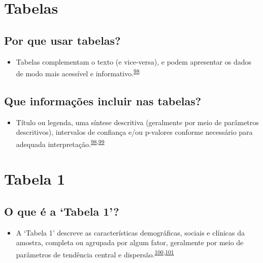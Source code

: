 \documentclass[
  a4paper,
]{book}
\providecommand{\tightlist}{%
  \setlength{\itemsep}{0pt}\setlength{\parskip}{0pt}}
\begin{document}
\hypertarget{tabelas}{%
\section{Tabelas}\label{tabelas}}

\hypertarget{por-que-usar-tabelas}{%
\subsection{Por que usar tabelas?}\label{por-que-usar-tabelas}}

\begin{itemize}
\tightlist
\item
  Tabelas complementam o texto (e vice-versa), e podem apresentar os dados de modo mais acessível e informativo.\textsuperscript{\protect\hyperlink{ref-Inskip2017}{98}}
\end{itemize}

\hypertarget{que-informauxe7uxf5es-incluir-nas-tabelas}{%
\subsection{Que informações incluir nas tabelas?}\label{que-informauxe7uxf5es-incluir-nas-tabelas}}

\begin{itemize}
\tightlist
\item
  Título ou legenda, uma síntese descritiva (geralmente por meio de parâmetros descritivos), intervalos de confiança e/ou p-valores conforme necessário para adequada interpretação.\textsuperscript{\protect\hyperlink{ref-Inskip2017}{98},\protect\hyperlink{ref-Kwak2021}{99}}
\end{itemize}

\hypertarget{tabela-1}{%
\section{Tabela 1}\label{tabela-1}}

\hypertarget{o-que-uxe9-a-tabela-1}{%
\subsection{O que é a `Tabela 1'?}\label{o-que-uxe9-a-tabela-1}}

\begin{itemize}
\tightlist
\item
  A `Tabela 1' descreve as características demográficas, sociais e clínicas da amostra, completa ou agrupada por algum fator, geralmente por meio de parâmetros de tendência central e dispersão.\textsuperscript{\protect\hyperlink{ref-Westreich2013}{100},\protect\hyperlink{ref-chen2020}{101}}
\end{itemize}
\end{document}
